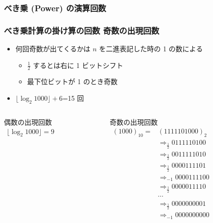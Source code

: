 \begin{frame}
\frametitle{べき乗 (Power) の演算回数}
\frametitle{べき乗計算の掛け算の回数 \textemdash 奇数の出現回数}
  \begin{itemize}
\item 何回奇数が出てくるかは $n$ を二進表記した時の 1 の数による
    \begin{itemize}
\item \(\frac{1}{2}\) するとは右に 1 ビットシフト
\item 最下位ビットが 1 のとき奇数
    \end{itemize}
\item \(\lfloor\log_2 1000\rfloor+6\)=15 回
  \end{itemize}
  \begin{columns}
    \begin{column}{0.45\textwidth}
      \begin{block}{偶数の出現回数}
        \begin{math}
          \begin{array}{c}
\lfloor\log_2 1000\rfloor = 9
          \end{array}
        \end{math}
      \end{block}
    \end{column}
    \begin{column}{0.5\textwidth}
      \begin{block}{奇数の出現回数}
\scriptsize
        \begin{math}
          \begin{array}{cl}
(1000)_{10}=&(1111101000)_{2}\\
&\Rightarrow_{\frac{1}{2}}0111110100\\
&\Rightarrow_{\frac{1}{2}}0011111010\\
&\Rightarrow_{\frac{1}{2}}0000111101\\
&\Rightarrow_{-1}0000111100\\
&\Rightarrow_{\frac{1}{2}}0000011110\\
&\cdots\\
&\Rightarrow_{\frac{1}{2}}0000000001\\
&\Rightarrow_{-1}0000000000
          \end{array}
        \end{math}
      \end{block}
    \end{column}
  \end{columns}
\end{frame}
